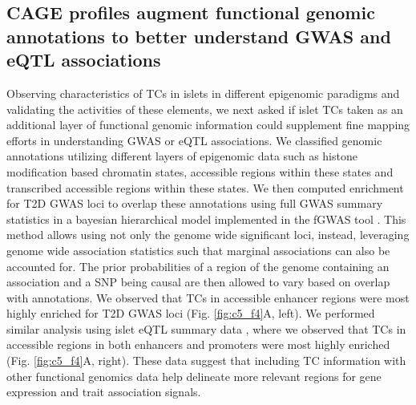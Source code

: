 \subsection{CAGE profiles augment functional genomic annotations to better understand GWAS and eQTL associations}
Observing characteristics of TCs in islets in different epigenomic paradigms and validating the activities of these elements, we next asked if islet TCs taken as an additional layer of functional genomic information could supplement fine mapping efforts in understanding GWAS or eQTL associations. We classified genomic annotations utilizing different layers of epigenomic data such as histone modification based chromatin states, accessible regions within these states and transcribed accessible regions within these states. We then computed enrichment for T2D GWAS loci to overlap these annotations using full GWAS summary statistics \cite{mahajanFinemappingTypeDiabetes2018} in a bayesian hierarchical model implemented in the fGWAS tool \cite{pickrellJointAnalysisFunctional2014}. This method allows using not only the genome wide significant loci, instead, leveraging genome wide association statistics such that marginal associations can also be accounted for. The prior probabilities of a region of the genome containing an association and a SNP being causal are then allowed to vary based on overlap with annotations. We observed that TCs in accessible enhancer regions were most highly enriched for T2D GWAS loci (Fig. \ref{fig:c5_f4}A, left). We performed similar analysis using islet eQTL summary data \cite{varshneyGeneticRegulatorySignatures2017}, where we observed that TCs in accessible regions in both enhancers and promoters were most highly enriched (Fig. \ref{fig:c5_f4}A, right). These data suggest that including TC information with other functional genomics data help delineate more relevant regions for gene expression and trait association signals.     


